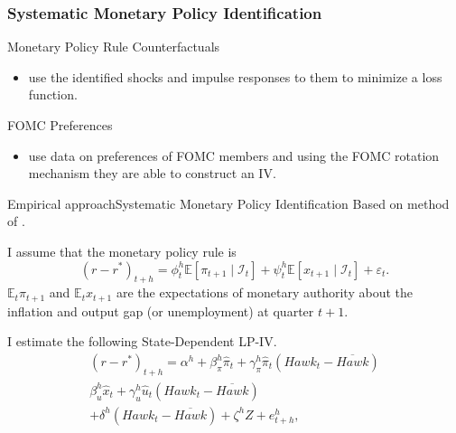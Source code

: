 \documentclass[11pt,pdf,aspectratio=129]{beamer}
\begin{document}
\begin{frame}\frametitle{Systematic Monetary Policy Identification}    
    \begin{block}{Monetary Policy Rule Counterfactuals}
        \begin{itemize}
            \item \citet{McKayWolf2023, BarnichonMesters2023} use the identified shocks and impulse responses to them to minimize a loss function. 
        \end{itemize}
    \end{block}
    \begin{alertblock}{FOMC Preferences}
        \begin{itemize}
            \item  \citet{HIM2023} use \citet{Istrefi2019} data on preferences of FOMC members and using the FOMC rotation mechanism they are able to construct an IV. 
        \end{itemize}
    \end{alertblock}
    \end{frame}




\begin{frame}{Empirical approach}{Systematic Monetary Policy Identification}
Based on method of \citet{HIM2023}.

I assume that the monetary policy rule is 
\[\left(r-r^*\right)_{t+h}=\phi_t^h\mathbb{E}\left[\pi_{t+1}\mid \mathcal{I}_t\right]+\psi_t^h\mathbb{E}\left[x_{t+1}\mid \mathcal{I}_t\right]+\varepsilon_t.\]
$\mathbb{E}_t\pi_{t+1}$ and $\mathbb{E}_t x_{t+1}$ are the expectations of monetary authority about the inflation and output gap (or unemployment) at quarter $t+1$.

I estimate the following State-Dependent LP-IV.
\begin{multline*}
    \left(r-r^*\right)_{t+h}=\alpha^h+\beta_\pi^h \hat\pi_t+\gamma_\pi^h \hat\pi_t\left(\mathit{Hawk}_{t}-\overline{\mathit{Hawk}}\right)\\ \beta_u^h \hat x_t+\gamma_u^h \hat u_t\left(\mathit{Hawk}_{t}-\overline{\mathit{Hawk}}\right)\\ +\delta^h\left(\mathit{Hawk}_{t}-\overline{\mathit{Hawk}}\right)+\zeta^hZ+e_{t+h}^h,
\end{multline*}
\end{frame}
\end{document}
